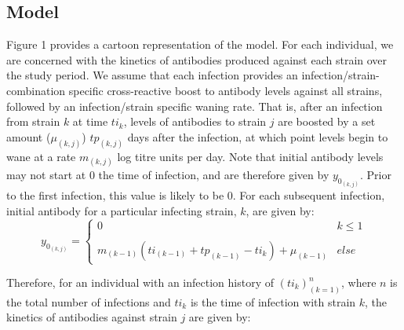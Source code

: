 \documentclass[a4paper,11pt,twoside]{article}
\begin{document}
\subsection{Model}
Figure 1 provides a cartoon representation of the model. For each individual, we are concerned with the kinetics of antibodies produced against each strain over the study period. We assume that each infection provides an infection/strain-combination specific cross-reactive boost to antibody levels against all strains, followed by an infection/strain specific waning rate. That is, after an infection from strain $k$ at time $ti_k$, levels of antibodies to strain $j$ are boosted by a set amount ($\mu_{(k,j)}$) $tp_{(k,j)}$ days after the infection, at which point levels begin to wane at a rate $m_{(k,j)}$ log titre units per day. Note that initial antibody levels may not start at 0 the time of infection, and are therefore given by $y_{0_{(k,j)}}$. Prior to the first infection, this value is likely to be 0. For each subsequent infection, initial antibody for a particular infecting strain, $k$, are given by:
\begin{equation}
 y_{0_{(k,j)}}=\left\{
\begin{array}{lr}
0 & k \leqslant 1\\\\
m_{(k-1)}(ti_{(k-1)}+tp_{(k-1)}-ti_k)+\mu_{(k-1)} & else
\end{array}
\right.
\end{equation}

Therefore, for an individual with an infection history of $(ti_k)_{(k=1)}^n$, where $n$ is the total number of infections and $ti_k$ is the time of infection with strain $k$, the kinetics of antibodies against strain $j$ are given by:
\end{document}
